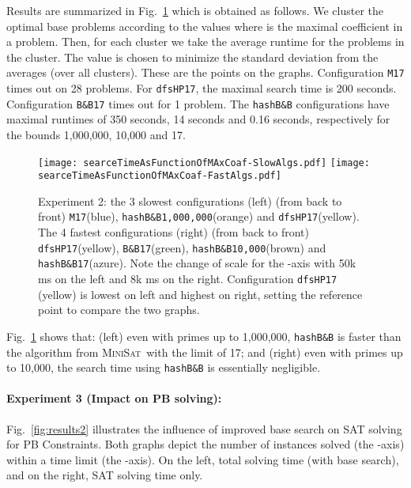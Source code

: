 \documentclass[envcountsame]{llncs}
\newcommand\minisatp{\textsc{MiniSat}}
\begin{document}
Results are summarized in Fig.~\ref{fig:results1} which is obtained
as follows. We cluster the optimal base problems according to the
values  where  is the maximal
coefficient in a problem. Then, for each cluster we take the average
runtime for the problems in the cluster. The value  is chosen
to minimize the standard deviation from the averages (over all
clusters). These are the points on the graphs.
Configuration \texttt{M17} times out on 28
problems.  For \texttt{dfsHP17}, the maximal search time is 200
seconds.  Configuration \texttt{B\&B17} times out for 1 problem.  The
\texttt{hashB\&B} configurations have maximal runtimes of 350 seconds,
14 seconds and 0.16 seconds, respectively for the bounds 1,000,000,
10,000 and 17.
\begin{figure}
  \centering
  \vspace{-3ex}
  \texttt{[image: searceTimeAsFunctionOfMAxCoaf-SlowAlgs.pdf]}
  \texttt{[image: searceTimeAsFunctionOfMAxCoaf-FastAlgs.pdf]}
  \vspace{-3ex}
\caption{Experiment 2: the 3 slowest configurations (left)
    (from back to front)
    \texttt{M17}(blue), \texttt{hashB\&B1,000,000}(orange) and
    \texttt{dfsHP17}(yellow).  
The 4 fastest configurations (right) (from back to front)
    \texttt{dfsHP17}(yellow), \texttt{B\&B17}(green),
    \texttt{hashB\&B10,000}(brown) and \texttt{hashB\&B17}(azure).
Note the change of scale for the -axis with 50k ms on the left
    and 8k ms on the right. Configuration \texttt{dfsHP17} (yellow) is
    lowest on left and highest on right, setting the reference point
    to compare the two graphs. \vspace{-5mm}}

\label{fig:results1}
\vspace{-1ex}
\end{figure}


Fig.~\ref{fig:results1} shows  that: (left)  even with primes
up to 1,000,000, \texttt{hashB\&B} is faster than the algorithm from
\minisatp\ with the limit of 17; and
(right)  even with primes
up to 10,000, the search time using \texttt{hashB\&B} is essentially
negligible.







\paragraph{Experiment 3 (Impact on PB solving):}
Fig.~\ref{fig:results2} illustrates the influence of improved base
search on SAT solving for PB Constraints. Both graphs
depict the number of instances solved (the -axis) within a
time limit (the -axis). On the left, total solving time
(with base search), and on the right, SAT solving time only.
\end{document}
